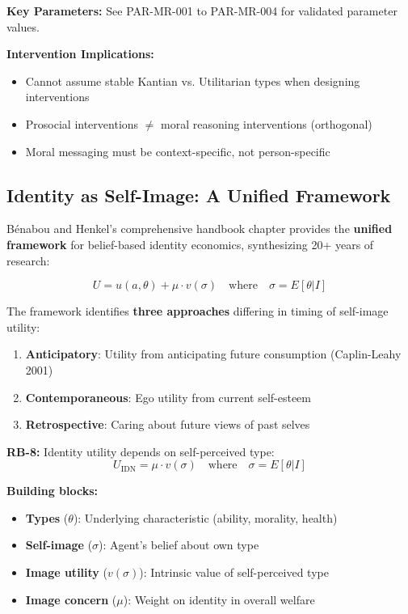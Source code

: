 \textbf{Key Parameters:} See PAR-MR-001 to PAR-MR-004 for validated parameter values.

\textbf{Intervention Implications:}
\begin{itemize}
    \item Cannot assume stable Kantian vs. Utilitarian types when designing interventions
    \item Prosocial interventions $\neq$ moral reasoning interventions (orthogonal)
    \item Moral messaging must be context-specific, not person-specific
\end{itemize}

\subsection{Identity as Self-Image: A Unified Framework}
\label{subsec:rb-identity-self-image}

Bénabou and Henkel's comprehensive handbook chapter \citep{benabou_henkel_2025_identity_self_image} provides the \textbf{unified framework} for belief-based identity economics, synthesizing 20+ years of research:

\begin{equation}
U = u(a, \theta) + \mu \cdot v(\sigma) \quad \text{where} \quad \sigma = E[\theta|I]
\label{eq:rb-self-image}
\end{equation}

The framework identifies \textbf{three approaches} differing in timing of self-image utility:
\begin{enumerate}
    \item \textbf{Anticipatory}: Utility from anticipating future consumption (Caplin-Leahy 2001)
    \item \textbf{Contemporaneous}: Ego utility from current self-esteem
    \item \textbf{Retrospective}: Caring about future views of past selves
\end{enumerate}

\begin{axiom}
\label{ax:rb-8}
\textbf{RB-8:} Identity utility depends on self-perceived type:
\begin{equation}
U_{\text{IDN}} = \mu \cdot v(\sigma) \quad \text{where} \quad \sigma = E[\theta|I]
\end{equation}

\textbf{Building blocks:}
\begin{itemize}
    \item \textbf{Types} ($\theta$): Underlying characteristic (ability, morality, health)
    \item \textbf{Self-image} ($\sigma$): Agent's belief about own type
    \item \textbf{Image utility} ($v(\sigma)$): Intrinsic value of self-perceived type
    \item \textbf{Image concern} ($\mu$): Weight on identity in overall welfare
\end{itemize}
\end{axiom}

